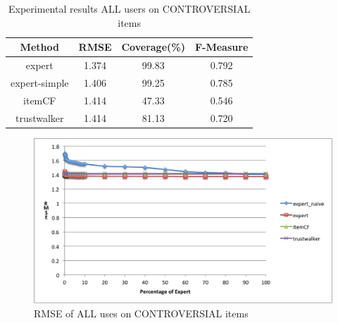 \documentclass[12pt]{article}
\begin{document}
\begin{table}[htbp]
	\centering
		\begin{tabular} {| c | c | c | c |  }
			\hline
			Method & RMSE & Coverage(\%) & F-Measure \\ \hline \hline
			expert & 1.374 & 99.83 & 0.792 \\ \hline
			expert-simple & 1.406 & 99.25 & 0.785 \\ \hline
			itemCF & 1.414 & 47.33 & 0.546 \\ \hline
			trustwalker & 1.414 & 81.13 & 0.720 \\ \hline
			\hline
		\end{tabular}
	\caption{Experimental results ALL users on CONTROVERSIAL items}
	\label{tbl:compare_controversial}
\end{table}



\begin{figure}[htbp]
\centering
	\includegraphics[width=12cm]{graphics/con_all_user.png}	
	\caption{RMSE of ALL uses on CONTROVERSIAL items}
	\label{fig:con_all_user}
\end{figure}
\end{document}
